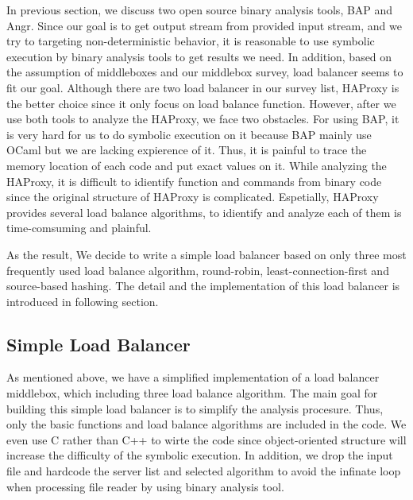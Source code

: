 In previous section, we discuss two open source binary analysis tools, BAP and Angr.
Since our goal is to get output stream from provided input stream, and we try to targeting non-deterministic behavior, it is reasonable to use symbolic execution by binary analysis tools to get results we need.
In addition, based on the assumption of middleboxes and our middlebox survey, load balancer seems to fit our goal.
Although there are two load balancer in our survey list, HAProxy is the better choice since it only focus on load balance function.
However, after we use both tools to analyze the HAProxy, we face two obstacles.
\ci For using BAP, it is very hard for us to do symbolic execution on it because BAP mainly use OCaml but we are lacking expierence of it.
Thus, it is painful to trace the memory location of each code and put exact values on it.
\cii While analyzing the HAProxy, it is difficult to idientify function and commands from binary code since the original structure of HAProxy is complicated.
Espetially, HAProxy provides several load balance algorithms, to idientify and analyze each of them is time-comsuming and plainful.

As the result, We decide to write a simple load balancer based on only three most frequently used load balance algorithm, \ca round-robin, \cb least-connection-first and \cc source-based hashing.
The detail and the implementation of this load balancer is introduced in following section.

\subsection{Simple Load Balancer}

As mentioned above, we have a simplified implementation of a load balancer
middlebox, which including three load balance algorithm.
The main goal for building this simple load balancer is to simplify the analysis procesure.
Thus, only the basic functions and load balance algorithms are included in the code.
We even use C rather than C++ to wirte the code since object-oriented structure will increase the difficulty of the symbolic execution.
In addition, we drop the input file and hardcode the server list and selected algorithm to avoid the infinate loop when processing file reader by using binary analysis tool.

